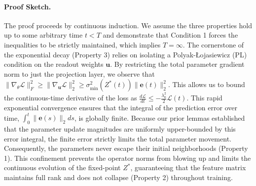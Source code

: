 \documentclass[twoside]{article}
\begin{document}
\paragraph{Proof Sketch.}
The proof proceeds by continuous induction. We assume the three properties hold up to some arbitrary time $t < T$ and demonstrate that Condition 1 forces the inequalities to be strictly maintained, which implies $T = \infty$. The cornerstone of the exponential decay (Property 3) relies on isolating a Polyak-Łojasiewicz (PL) condition on the readout weights $\mathbf{u}$. By restricting the total parameter gradient norm to just the projection layer, we observe that $\|\nabla_\theta \mathcal{L}\|_F^2 \ge \|\nabla_{\mathbf{u}} \mathcal{L}\|_2^2 \ge \sigma_{\min}^2(Z^*(t)) \|\mathbf{e}(t)\|_2^2$. This allows us to bound the continuous-time derivative of the loss as $\frac{d\mathcal{L}}{dt} \le -\frac{\lambda_0^2}{2} \mathcal{L}(t)$. This rapid exponential convergence ensures that the integral of the prediction error over time, $\int_0^t \|\mathbf{e}(s)\|_2 ds$, is globally finite. Because our prior lemmas established that the parameter update magnitudes are uniformly upper-bounded by this error integral, the finite error strictly limits the total parameter movement. Consequently, the parameters never escape their initial neighborhoods (Property 1). This confinement prevents the operator norms from blowing up and limits the continuous evolution of the fixed-point $Z^*$, guaranteeing that the feature matrix maintains full rank and does not collapse (Property 2) throughout training.
\end{document}
